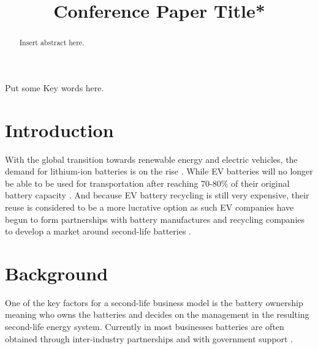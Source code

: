 \documentclass[conference]{IEEEtran}
\begin{document}
\title{Conference Paper Title*\\
}

\author{
\and
{}
}

\maketitle

\begin{abstract}
Insert abstract here.
\end{abstract}

\begin{IEEEkeywords}
Put some Key words here.
\end{IEEEkeywords}

\section{Introduction}

With the global transition towards renewable energy and electric vehicles, the demand for lithium-ion batteries is on the rise \cite{b1}. While EV batteries will no longer be able to be used for transportation after reaching 70-80\% of their original battery capacity \cite{b2}. And because EV battery recycling is still very expensive, their reuse is considered to be a more lucrative option as such EV companies have begun to form partnerships with battery manufactures and recycling companies to develop a market around second-life batteries \cite{b3}.

\section{Background}

One of the key factors for a second-life business model is the battery ownership meaning who owns the batteries and decides on the management in the resulting second-life energy system. Currently in most businesses batteries are often obtained through inter-industry partnerships and with government support \cite{b4}.
\end{document}
